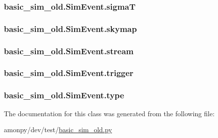 \hypertarget{classbasic__sim__old_1_1_sim_event_afd43199470abde63072e5e91d8217cf7}{
\subsubsection[{sigma\-T}]{\setlength{\rightskip}{0pt plus 5cm}basic\-\_\-sim\-\_\-old.\-Sim\-Event.\-sigma\-T}}\label{classbasic__sim__old_1_1_sim_event_afd43199470abde63072e5e91d8217cf7}
\hypertarget{classbasic__sim__old_1_1_sim_event_a3963adc4a383e33d00e1be986fa37371}{
\subsubsection[{skymap}]{\setlength{\rightskip}{0pt plus 5cm}basic\-\_\-sim\-\_\-old.\-Sim\-Event.\-skymap}}\label{classbasic__sim__old_1_1_sim_event_a3963adc4a383e33d00e1be986fa37371}
\hypertarget{classbasic__sim__old_1_1_sim_event_ac75852235bc1c9636274dbfb52d22394}{
\subsubsection[{stream}]{\setlength{\rightskip}{0pt plus 5cm}basic\-\_\-sim\-\_\-old.\-Sim\-Event.\-stream}}\label{classbasic__sim__old_1_1_sim_event_ac75852235bc1c9636274dbfb52d22394}
\hypertarget{classbasic__sim__old_1_1_sim_event_ad97bf46d023e5e0b3e31471c33476b3a}{
\subsubsection[{trigger}]{\setlength{\rightskip}{0pt plus 5cm}basic\-\_\-sim\-\_\-old.\-Sim\-Event.\-trigger}}\label{classbasic__sim__old_1_1_sim_event_ad97bf46d023e5e0b3e31471c33476b3a}
\hypertarget{classbasic__sim__old_1_1_sim_event_aa62ee00b9bd61aec1cf8d675e10bcdb1}{
\subsubsection[{type}]{\setlength{\rightskip}{0pt plus 5cm}basic\-\_\-sim\-\_\-old.\-Sim\-Event.\-type}}\label{classbasic__sim__old_1_1_sim_event_aa62ee00b9bd61aec1cf8d675e10bcdb1}


The documentation for this class was generated from the following file\-:\begin{DoxyCompactItemize}
\item 
amonpy/dev/test/\hyperlink{basic__sim__old_8py}{basic\-\_\-sim\-\_\-old.\-py}\end{DoxyCompactItemize}
